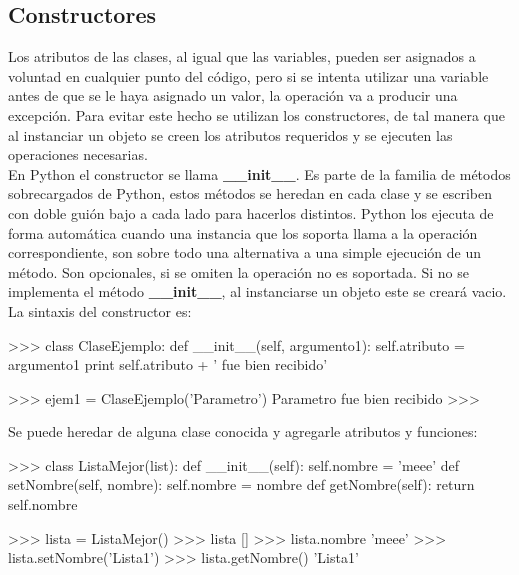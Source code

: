 \subsection{Constructores}

Los atributos de las clases, al igual que las variables, pueden ser asignados a voluntad en cualquier punto del código, pero si se intenta utilizar una variable antes de que se le haya asignado un valor, la operación va a producir una excepción. Para evitar este hecho se utilizan los constructores, de tal manera que al instanciar un objeto se creen los atributos requeridos y se ejecuten las operaciones necesarias.\\

En Python el constructor se llama \textbf{\_\_init\_\_}. Es parte de la familia de métodos sobrecargados de Python, estos métodos se heredan en cada clase y se escriben con doble guión bajo a cada lado para hacerlos distintos. Python los ejecuta de forma automática cuando una instancia que los soporta llama a la operación correspondiente, son sobre todo una alternativa a una simple ejecución de un método. Son opcionales, si se omiten la operación no es soportada. Si no se implementa el método \textbf{\_\_init\_\_}, al instanciarse un objeto este se creará vacio.\\

La sintaxis del constructor es:\\

\begin{pyglist} [language=python]
>>> class ClaseEjemplo:
         def __init__(self, argumento1):
             self.atributo = argumento1
             print self.atributo + ' fue bien recibido'
    
>>> ejem1 = ClaseEjemplo('Parametro')
Parametro fue bien recibido
>>> 
\end{pyglist}


Se puede heredar de alguna clase conocida y agregarle atributos y funciones:\\

\begin{pyglist} [language=python]
>>> class ListaMejor(list):
        def __init__(self):
            self.nombre = 'meee'
        def setNombre(self, nombre):
            self.nombre = nombre
        def getNombre(self):
            return self.nombre
    
>>> lista = ListaMejor()
>>> lista
[]
>>> lista.nombre
'meee'
>>> lista.setNombre('Lista1')
>>> lista.getNombre()
'Lista1'
\end{pyglist}




